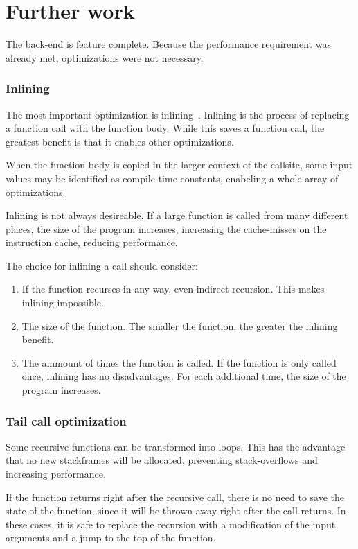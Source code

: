 \section{Further work}\label{recommendations}
The back-end is feature complete.
Because the performance requirement was already met, optimizations were not necessary.

\subsubsection{Inlining}
The most important optimization is inlining~\cite{inlining}.
Inlining is the process of replacing a function call with the function body.
While this saves a function call, the greatest benefit is that it enables other optimizations.

When the function body is copied in the larger context of the callsite, some input values may be identified as compile-time constants, enabeling a whole array of optimizations. 

Inlining is not always desireable.
If a large function is called from many different places, the size of the program increases, increasing the cache-misses on the instruction cache, reducing performance.

The choice for inlining a call should consider:
\begin{enumerate}
    \item If the function recurses in any way, even indirect recursion.
        This makes inlining impossible.
    \item The size of the function.
        The smaller the function, the greater the inlining benefit.
    \item The ammount of times the function is called.
        If the function is only called once, inlining has no disadvantages.
        For each additional time, the size of the program increases.
\end{enumerate}

\subsubsection{Tail call optimization}
Some recursive functions can be transformed into loops.
This has the advantage that no new stackframes will be allocated, preventing stack-overflows and increasing performance.

If the function returns right after the recursive call, there is no need to save the state of the function, since it will be thrown away right after the call returns.
In these cases, it is safe to replace the recursion with a modification of the input arguments and a jump to the top of the function.

